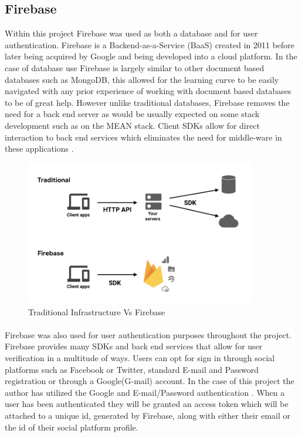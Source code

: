 \subsection{Firebase} 
Within this project Firebase was used as both a database and for user authentication. Firebase is a Backend-as-a-Service (BaaS) created in 2011 before later being acquired by Google and being developed into a cloud platform. In the case of database use Firebase is largely similar to other document based databases such as MongoDB, this allowed for the learning curve to be easily navigated with any prior experience of working with document based databases to be of great help. However unlike traditional databases, Firebase removes the need for a back end server as would be usually expected on some stack development such as on the MEAN stack. Client SDKs allow for direct interaction to back end services which eliminates the need for middle-ware in these applications \cite{firebase}. \\
\begin{figure}[h!]
    	\caption{Traditional Infrastructure Vs Firebase}
	\centering
	\includegraphics[width=0.9\textwidth]{images/firebase.png}
\end{figure}

\newpage
\paragraph{}
Firebase was also used for user authentication purposes throughout the project. Firebase provides many SDKs and back end services that allow for user verification in a multitude of ways. Users can opt for sign in through social platforms such as Facebook or Twitter, standard E-mail and Password registration or through a Google(G-mail) account. In the case of this project the author has utilized the Google and E-mail/Password authentication \cite{fireauth}. When a user has been authenticated they will be granted an access token which will be attached to a unique id, generated by Firebase, along with either their email or the id of their social platform profile. \\


